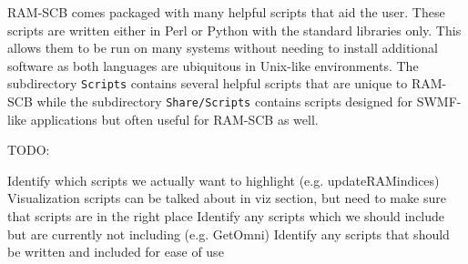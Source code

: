 RAM-SCB comes packaged with many helpful scripts that aid the user.  These scripts are written either in Perl or Python with the standard libraries only. This allows them to be run on many systems without needing to install additional software as both languages are ubiquitous in Unix-like environments. The subdirectory {\tt Scripts} contains several helpful scripts that are unique to RAM-SCB while the subdirectory {\tt Share/Scripts} contains scripts designed for SWMF-like applications but often useful for RAM-SCB as well.

TODO:

Identify which scripts we actually want to highlight (e.g. updateRAMindices)
Visualization scripts can be talked about in viz section, but need to make sure that scripts are in the right place
Identify any scripts which we should include but are currently not including (e.g. GetOmni)
Identify any scripts that should be written and included for ease of use




